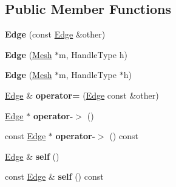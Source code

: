 \subsection*{Public Member Functions}
\begin{DoxyCompactItemize}
\item 
\hypertarget{classINMOST_1_1Edge_a5304345db2e5281455e2ef574d8ded70}{{\bfseries Edge} (const \hyperlink{classINMOST_1_1Edge}{Edge} \&other)}\label{classINMOST_1_1Edge_a5304345db2e5281455e2ef574d8ded70}

\item 
\hypertarget{classINMOST_1_1Edge_ae963d37a92085320893d846226c3027d}{{\bfseries Edge} (\hyperlink{classINMOST_1_1Mesh}{Mesh} $\ast$m, Handle\-Type h)}\label{classINMOST_1_1Edge_ae963d37a92085320893d846226c3027d}

\item 
\hypertarget{classINMOST_1_1Edge_aaaae84f52183a0faa90259d0020c0a39}{{\bfseries Edge} (\hyperlink{classINMOST_1_1Mesh}{Mesh} $\ast$m, Handle\-Type $\ast$h)}\label{classINMOST_1_1Edge_aaaae84f52183a0faa90259d0020c0a39}

\item 
\hypertarget{classINMOST_1_1Edge_a94ce93c2543797423d9505bce0ba77a8}{\hyperlink{classINMOST_1_1Edge}{Edge} \& {\bfseries operator=} (\hyperlink{classINMOST_1_1Edge}{Edge} const \&other)}\label{classINMOST_1_1Edge_a94ce93c2543797423d9505bce0ba77a8}

\item 
\hypertarget{classINMOST_1_1Edge_a55a79bd76daa99a5b27e5e47a179b318}{\hyperlink{classINMOST_1_1Edge}{Edge} $\ast$ {\bfseries operator-\/$>$} ()}\label{classINMOST_1_1Edge_a55a79bd76daa99a5b27e5e47a179b318}

\item 
\hypertarget{classINMOST_1_1Edge_a6e0a5b2c149f6da32e29a1381a9fea2b}{const \hyperlink{classINMOST_1_1Edge}{Edge} $\ast$ {\bfseries operator-\/$>$} () const }\label{classINMOST_1_1Edge_a6e0a5b2c149f6da32e29a1381a9fea2b}

\item 
\hypertarget{classINMOST_1_1Edge_ae49901107845bc2e4221018efea735bf}{\hyperlink{classINMOST_1_1Edge}{Edge} \& {\bfseries self} ()}\label{classINMOST_1_1Edge_ae49901107845bc2e4221018efea735bf}

\item 
\hypertarget{classINMOST_1_1Edge_a96dd80d27987140428b1f047e56d5549}{const \hyperlink{classINMOST_1_1Edge}{Edge} \& {\bfseries self} () const }\label{classINMOST_1_1Edge_a96dd80d27987140428b1f047e56d5549}


\end{DoxyCompactItemize}
